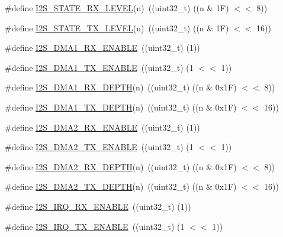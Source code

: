 \begin{DoxyCompactItemize}
\item 
\#define \hyperlink{group___i2_s__18_x_x__43_x_x_gab51548f7e41cb523a77beb7c88c5d33a}{I2\+S\+\_\+\+S\+T\+A\+T\+E\+\_\+\+R\+X\+\_\+\+L\+E\+V\+EL}(n)~((uint32\+\_\+t) ((n \& 1\+F) $<$$<$ 8))
\item 
\#define \hyperlink{group___i2_s__18_x_x__43_x_x_ga2421a91f0ddda94150de2f80c4192039}{I2\+S\+\_\+\+S\+T\+A\+T\+E\+\_\+\+T\+X\+\_\+\+L\+E\+V\+EL}(n)~((uint32\+\_\+t) ((n \& 1\+F) $<$$<$ 16))
\item 
\#define \hyperlink{group___i2_s__18_x_x__43_x_x_ga7b643833c4b80116d3026c7933449001}{I2\+S\+\_\+\+D\+M\+A1\+\_\+\+R\+X\+\_\+\+E\+N\+A\+B\+LE}~((uint32\+\_\+t) (1))
\item 
\#define \hyperlink{group___i2_s__18_x_x__43_x_x_ga0fb809d583bb8b68d34f347d19933575}{I2\+S\+\_\+\+D\+M\+A1\+\_\+\+T\+X\+\_\+\+E\+N\+A\+B\+LE}~((uint32\+\_\+t) (1 $<$$<$ 1))
\item 
\#define \hyperlink{group___i2_s__18_x_x__43_x_x_gaee0ebb1d1bc7444e2201d4473c41f182}{I2\+S\+\_\+\+D\+M\+A1\+\_\+\+R\+X\+\_\+\+D\+E\+P\+TH}(n)~((uint32\+\_\+t) ((n \& 0x1\+F) $<$$<$ 8))
\item 
\#define \hyperlink{group___i2_s__18_x_x__43_x_x_ga4eedce5a4fc3c03413a4d7cfdd0f60de}{I2\+S\+\_\+\+D\+M\+A1\+\_\+\+T\+X\+\_\+\+D\+E\+P\+TH}(n)~((uint32\+\_\+t) ((n \& 0x1\+F) $<$$<$ 16))
\item 
\#define \hyperlink{group___i2_s__18_x_x__43_x_x_ga2e4e8b4d132b01bb74d57dd34ca7eaef}{I2\+S\+\_\+\+D\+M\+A2\+\_\+\+R\+X\+\_\+\+E\+N\+A\+B\+LE}~((uint32\+\_\+t) (1))
\item 
\#define \hyperlink{group___i2_s__18_x_x__43_x_x_ga2ceda1798034a70380c9a9de567bb6b0}{I2\+S\+\_\+\+D\+M\+A2\+\_\+\+T\+X\+\_\+\+E\+N\+A\+B\+LE}~((uint32\+\_\+t) (1 $<$$<$ 1))
\item 
\#define \hyperlink{group___i2_s__18_x_x__43_x_x_gaa988d9e73e80df6ce687e148ee9530ae}{I2\+S\+\_\+\+D\+M\+A2\+\_\+\+R\+X\+\_\+\+D\+E\+P\+TH}(n)~((uint32\+\_\+t) ((n \& 0x1\+F) $<$$<$ 8))
\item 
\#define \hyperlink{group___i2_s__18_x_x__43_x_x_gaff02275ceaf3866c99b464b11ed0a270}{I2\+S\+\_\+\+D\+M\+A2\+\_\+\+T\+X\+\_\+\+D\+E\+P\+TH}(n)~((uint32\+\_\+t) ((n \& 0x1\+F) $<$$<$ 16))
\item 
\#define \hyperlink{group___i2_s__18_x_x__43_x_x_ga362154dbf216f1384f535c940d930cd9}{I2\+S\+\_\+\+I\+R\+Q\+\_\+\+R\+X\+\_\+\+E\+N\+A\+B\+LE}~((uint32\+\_\+t) (1))
\item 
\#define \hyperlink{group___i2_s__18_x_x__43_x_x_ga7811db5a292d68de3dce209883bab6c0}{I2\+S\+\_\+\+I\+R\+Q\+\_\+\+T\+X\+\_\+\+E\+N\+A\+B\+LE}~((uint32\+\_\+t) (1 $<$$<$ 1))
$$
\end{DoxyCompactItemize}
